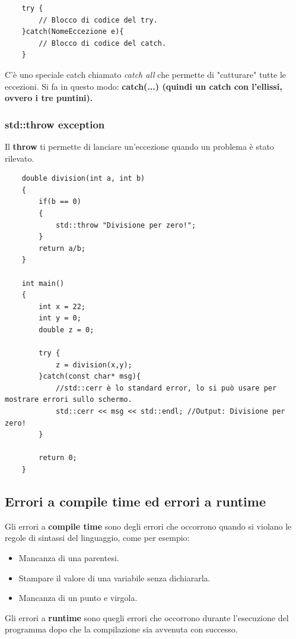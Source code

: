 \begin{lstlisting}
	try {
		// Blocco di codice del try.
	}catch(NomeEccezione e){
		// Blocco di codice del catch.
	}
\end{lstlisting}

\textsf{\small C'è uno speciale catch chiamato \emph{catch all} che permette di "catturare" tutte le eccezioni. Si fa in questo modo: \textbf{catch(...) (quindi un catch con l'ellissi, ovvero i tre puntini).}}

\subsubsection{std::throw exception}

\textsf{\small Il \textbf{throw} ti permette di lanciare un'eccezione quando un problema è stato rilevato.} \\

\begin{lstlisting}
	double division(int a, int b)
	{
		if(b == 0)
		{
			std::throw "Divisione per zero!";
		}
		return a/b;
	}

	int main()
	{
		int x = 22;
		int y = 0;
		double z = 0;
		
		try {
			z = division(x,y);
		}catch(const char* msg){
			//std::cerr è lo standard error, lo si può usare per mostrare errori sullo schermo.
			std::cerr << msg << std::endl; //Output: Divisione per zero!
		}
	
		return 0;
	}
\end{lstlisting}

\subsection{Errori a compile time ed errori a runtime}

\textsf{\small Gli errori a \textbf{compile time} sono degli errori che occorrono quando si violano le regole di sintassi del linguaggio, come per esempio: } \\

\begin{itemize}
	\item \textsf{\small Mancanza di una parentesi.}
	\item \textsf{\small Stampare il valore di una variabile senza dichiararla.}
	\item \textsf{\small Mancanza di un punto e virgola.}
\end{itemize}

\textsf{\small Gli errori a \textbf{runtime} sono quegli errori che occorrono durante l'esecuzione del programma dopo che la compilazione sia avvenuta con successo.} \break %

